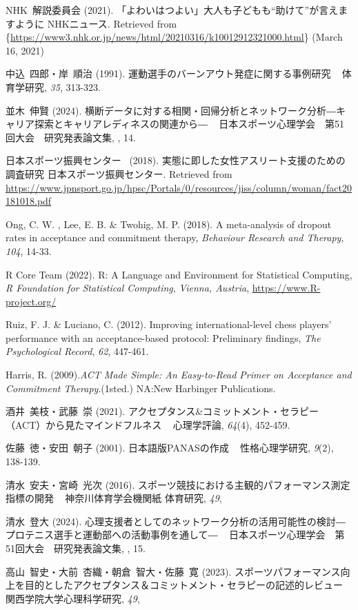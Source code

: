 \documentclass[12pt,a4paper,xelatex,ja=standard]{bxjsarticle}
\begin{document}
NHK~解説委員会 (2021).
「よわいはつよい」大人も子どもも``助けて''が言えますように NHKニュース.
Retrieved from
\{\url{https://www3.nhk.or.jp/news/html/20210316/k10012912321000.html}\}
(March 16, 2021)

中込~四郎・岸~順治 (1991). 運動選手のバーンアウト発症に関する事例研究 ~
体育学研究, \emph{35}, 313-323.

並木~伸賢 (2024).
横断データに対する相関・回帰分析とネットワーク分析―キャリア探索とキャリアレディネスの関連から―
~ 日本スポーツ心理学会　第51回大会　研究発表論文集, , 14.

日本スポーツ振興センター~ (2018).
実態に即した女性アスリート支援のための調査研究 日本スポーツ振興センター.
Retrieved from
\url{https://www.jpnsport.go.jp/hpsc/Portals/0/resources/jiss/column/woman/fact20181018.pdf}

Ong, C. W. , Lee, E. B. \& Twohig, M. P. (2018). A meta-analysis of
dropout rates in acceptance and commitment therapy,
\emph{Behaviour Research and Therapy}, \emph{104}, 14-33.

R Core Team (2022). R: A Language and Environment for Statistical
Computing, \emph{R Foundation for Statistical Computing},
\emph{Vienna, Austria}, \url{https://www.R-project.org/}

Ruiz, F. J. \& Luciano, C. (2012). Improving international-level chess
players' performance with an acceptance-based protocol: Preliminary
findings, \emph{The Psychological Record}, \emph{62}, 447-461.

Harris, R.
(2009).\emph{ACT Made Simple: An Easy-to-Read Primer on Acceptance and Commitment Therapy}.(1sted.)
NA:New Harbinger Publications.

酒井~美枝・武藤~崇 (2021).
アクセプタンス\&コミットメント・セラピー（ACT）から見たマインドフルネス
~ 心理学評論, \emph{64}(4), 452-459.

佐藤~徳・安田~朝子 (2001). 日本語版PANASの作成 ~ 性格心理学研究,
\emph{9}(2), 138-139.

清水~安夫・宮崎~光次 (2016).
スポーツ競技における主観的パフォーマンス測定指標の開発 ~
神奈川体育学会機関紙 体育研究, \emph{49},

清水~登大 (2024).
心理支援者としてのネットワーク分析の活用可能性の検討―プロテニス選手と運動部への活動事例を通して―
~ 日本スポーツ心理学会　第51回大会　研究発表論文集, , 15.

高山~智史・大前~杏織・朝倉~智大・佐藤~寛 (2023).
スポーツパフォーマンス向上を目的としたアクセプタンス＆コミットメント・セラピーの記述的レビュー
~ 関西学院大学心理科学研究, \emph{49},
\end{document}
